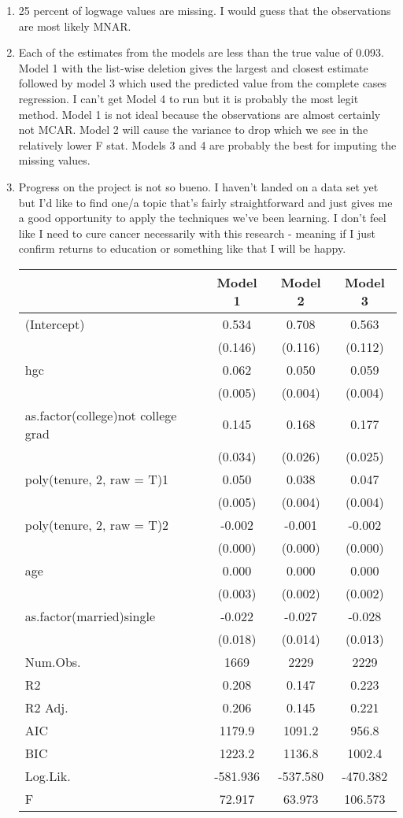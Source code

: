 \documentclass{article}
\begin{document}
\begin{enumerate}
    \item 25 percent of logwage values are missing. I would guess that the observations are most likely MNAR. 
    \item Each of the estimates from the models are less than the true value of 0.093. Model 1 with the list-wise deletion gives the largest and closest estimate followed by model 3 which used the predicted value from the complete cases regression. I can't get Model 4 to run but it is probably the most legit method. Model 1 is not ideal because the observations are almost certainly not MCAR. Model 2 will cause the variance to drop which we see in the relatively lower F stat. Models 3 and 4 are probably the best for imputing the missing values. 
    \item Progress on the project is not so bueno. I haven't landed on a data set yet but I'd like to find one/a topic that's fairly straightforward and just gives me a good opportunity to apply the techniques we've been learning. I don't feel like I need to cure cancer necessarily with this research - meaning if I just confirm returns to education or something like that I will be happy. 
\begin{table}
\centering
\begin{tabular}[t]{lccc}
\toprule
  & Model 1 & Model 2 & Model 3\\
\midrule
(Intercept) & 0.534 & 0.708 & 0.563\\
 & (0.146) & (0.116) & (0.112)\\
hgc & 0.062 & 0.050 & 0.059\\
 & (0.005) & (0.004) & \vphantom{1} (0.004)\\
as.factor(college)not college grad & 0.145 & 0.168 & 0.177\\
 & (0.034) & (0.026) & (0.025)\\
poly(tenure, 2, raw = T)1 & 0.050 & 0.038 & 0.047\\
 & (0.005) & (0.004) & (0.004)\\
poly(tenure, 2, raw = T)2 & -0.002 & -0.001 & -0.002\\
 & (0.000) & (0.000) & (0.000)\\
age & 0.000 & 0.000 & 0.000\\
 & (0.003) & (0.002) & (0.002)\\
as.factor(married)single & -0.022 & -0.027 & -0.028\\
 & (0.018) & (0.014) & (0.013)\\
\midrule
Num.Obs. & 1669 & 2229 & 2229\\
R2 & 0.208 & 0.147 & 0.223\\
R2 Adj. & 0.206 & 0.145 & 0.221\\
AIC & 1179.9 & 1091.2 & 956.8\\
BIC & 1223.2 & 1136.8 & 1002.4\\
Log.Lik. & -581.936 & -537.580 & -470.382\\
F & 72.917 & 63.973 & 106.573\\
\bottomrule
\end{tabular}
\end{table}


\end{enumerate}
\end{document}
